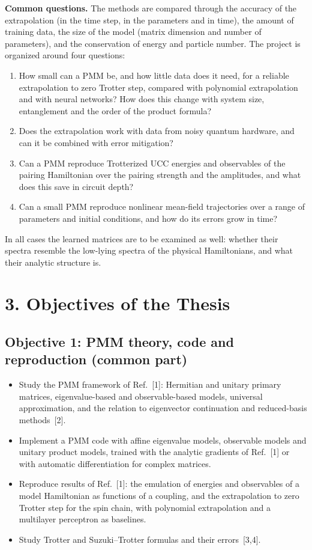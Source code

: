 \documentclass[12pt,a4paper]{article}
\begin{document}
\textbf{Common questions.}  The methods are compared through the
accuracy of the extrapolation (in the time step, in the parameters and
in time), the amount of training data, the size of the model (matrix
dimension and number of parameters), and the conservation of energy
and particle number.  The project is organized around four questions:
\begin{enumerate}
  \item How small can a PMM be, and how little data does it need, for
  a reliable extrapolation to zero Trotter step, compared with
  polynomial extrapolation and with neural networks?  How does this
  change with system size, entanglement and the order of the product
  formula?
  \item Does the extrapolation work with data from noisy quantum
  hardware, and can it be combined with error mitigation?
  \item Can a PMM reproduce Trotterized UCC energies and observables
  of the pairing Hamiltonian over the pairing strength and the
  amplitudes, and what does this save in circuit depth?
  \item Can a small PMM reproduce nonlinear mean-field trajectories
  over a range of parameters and initial conditions, and how do its
  errors grow in time?
\end{enumerate}
In all cases the learned matrices are to be examined as well: whether
their spectra resemble the low-lying spectra of the physical
Hamiltonians, and what their analytic structure is.

\section*{3. Objectives of the Thesis}

\subsection*{Objective 1: PMM theory, code and reproduction (common part)}
\begin{itemize}
  \item Study the PMM framework of Ref.~[1]: Hermitian and unitary
  primary matrices, eigenvalue-based and observable-based models,
  universal approximation, and the relation to eigenvector
  continuation and reduced-basis methods~[2].
  \item Implement a PMM code with affine eigenvalue models, observable
  models and unitary product models, trained with the analytic
  gradients of Ref.~[1] or with automatic differentiation for complex
  matrices.
  \item Reproduce results of Ref.~[1]: the emulation of energies and
  observables of a model Hamiltonian as functions of a coupling, and
  the extrapolation to zero Trotter step for the spin chain, with
  polynomial extrapolation and a multilayer perceptron as baselines.
  \item Study Trotter and Suzuki--Trotter formulas and their
  errors~[3,4].
\end{itemize}
\end{document}
